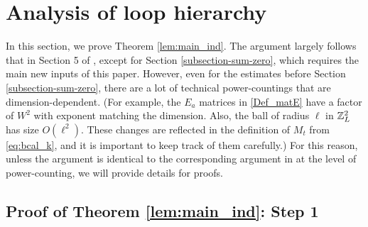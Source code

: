\section{Analysis of loop hierarchy}\label{Sec:Stoflo}

In this section, we prove Theorem \ref{lem:main_ind}. The argument largely follows that in Section 5 of \cite{YY_25}, except for Section \ref{subsection-sum-zero}, which requires the main new inputs of this paper. However, even for the estimates before Section \ref{subsection-sum-zero}, there are a lot of technical power-countings that are dimension-dependent. (For example, the $E_{a}$ matrices in \eqref{Def_matE} have a factor of $W^{2}$ with exponent matching the dimension. Also, the ball of radius $\ell$ in $\mathbb{Z}_{L}^{2}$ has size $O(\ell^{2})$. These changes are reflected in the definition of $M_{t}$ from \eqref{eq:bcal_k}, and it is important to keep track of them carefully.) For this reason, unless the argument is identical to the corresponding argument in \cite{YY_25} at the level of power-counting, we will provide details for proofs.

\subsection{Proof of Theorem \ref{lem:main_ind}: Step 1}


